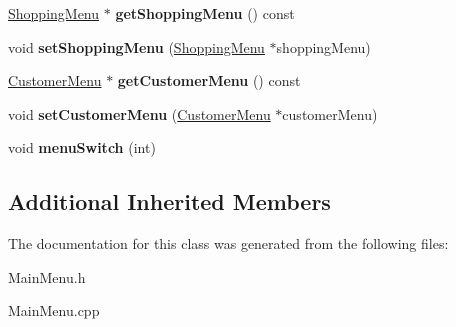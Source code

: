 \begin{DoxyCompactItemize}
\item 
\hyperlink{classShoppingMenu}{Shopping\+Menu} $\ast$ {\bfseries get\+Shopping\+Menu} () const \hypertarget{classMainMenu_aa85189f22902186d47c1610e9d92d911}{}\label{classMainMenu_aa85189f22902186d47c1610e9d92d911}

\item 
void {\bfseries set\+Shopping\+Menu} (\hyperlink{classShoppingMenu}{Shopping\+Menu} $\ast$shopping\+Menu)\hypertarget{classMainMenu_ae8cab8d0e2430d34bad64ba238b4cc4d}{}\label{classMainMenu_ae8cab8d0e2430d34bad64ba238b4cc4d}

\item 
\hyperlink{classCustomerMenu}{Customer\+Menu} $\ast$ {\bfseries get\+Customer\+Menu} () const \hypertarget{classMainMenu_ac8c258825449e5c4cc129004fb2e6589}{}\label{classMainMenu_ac8c258825449e5c4cc129004fb2e6589}

\item 
void {\bfseries set\+Customer\+Menu} (\hyperlink{classCustomerMenu}{Customer\+Menu} $\ast$customer\+Menu)\hypertarget{classMainMenu_a5c80f2e447ac6fca73b1527f9abd74b6}{}\label{classMainMenu_a5c80f2e447ac6fca73b1527f9abd74b6}

\item 
void {\bfseries menu\+Switch} (int)\hypertarget{classMainMenu_aabbf0c8aba7bc80316e150ea609e897f}{}\label{classMainMenu_aabbf0c8aba7bc80316e150ea609e897f}

\end{DoxyCompactItemize}
\subsection*{Additional Inherited Members}


The documentation for this class was generated from the following files\+:\begin{DoxyCompactItemize}
\item 
Main\+Menu.\+h\item 
Main\+Menu.\+cpp\end{DoxyCompactItemize}
